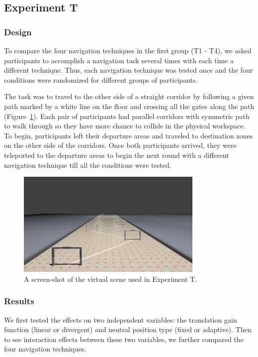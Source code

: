 \subsection{Experiment T}
\subsubsection{Design}
To compare the four navigation techniques in the first group (T1 - T4), we asked participants to accomplish a navigation task several times with each time a different technique. Thus, each navigation technique was tested once and the four conditions were randomized for different groups of participants.

The task was to travel to the other side of a straight corridor by following a given path marked by a white line on the floor and crossing all the gates along the path (Figure~\ref{fig:4_task1}). Each pair of participants had parallel corridors with symmetric path to walk through so they have more chance to collide in the physical workspace. To begin, participants left their departure areas and traveled to destination zones on the other side of the corridors. Once both participants arrived, they were teleported to the departure areas to begin the next round with a different navigation technique till all the conditions were tested.

\begin{figure}[tb]
  \centering
  \includegraphics[width=0.8\textwidth]{figures/ch4/t1}
  \caption{\label{fig:4_task1}A screen-shot of the virtual scene used in Experiment T.}
\end{figure}

\subsubsection{Results}
We first tested the effects on two independent variables: the translation gain function (linear or divergent) and neutral position type (fixed or adaptive). Then to see interaction effects between these two variables, we further compared the four navigation techniques.


